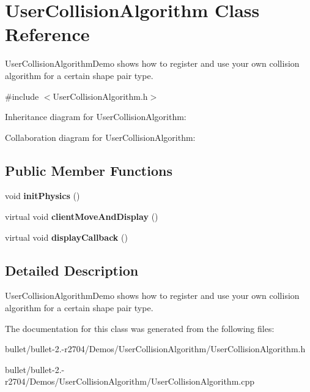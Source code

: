 \hypertarget{class_user_collision_algorithm}{\section{User\+Collision\+Algorithm Class Reference}
\label{class_user_collision_algorithm}
}


User\+Collision\+Algorithm\+Demo shows how to register and use your own collision algorithm for a certain shape pair type.  




{\ttfamily \#include $<$User\+Collision\+Algorithm.\+h$>$}



Inheritance diagram for User\+Collision\+Algorithm\+:


Collaboration diagram for User\+Collision\+Algorithm\+:
\subsection*{Public Member Functions}
\begin{DoxyCompactItemize}
\item 
\hypertarget{class_user_collision_algorithm_adafd6d63e2836fc74a3766aaf11a9df6}{void {\bfseries init\+Physics} ()}\label{class_user_collision_algorithm_adafd6d63e2836fc74a3766aaf11a9df6}

\item 
\hypertarget{class_user_collision_algorithm_afea476b5fac5451d4fbebf6a2bc62844}{virtual void {\bfseries client\+Move\+And\+Display} ()}\label{class_user_collision_algorithm_afea476b5fac5451d4fbebf6a2bc62844}

\item 
\hypertarget{class_user_collision_algorithm_a23e7fd07c13814ffe8f32566d62c318a}{virtual void {\bfseries display\+Callback} ()}\label{class_user_collision_algorithm_a23e7fd07c13814ffe8f32566d62c318a}

\end{DoxyCompactItemize}


\subsection{Detailed Description}
User\+Collision\+Algorithm\+Demo shows how to register and use your own collision algorithm for a certain shape pair type. 

The documentation for this class was generated from the following files\+:\begin{DoxyCompactItemize}
\item 
bullet/bullet-\/2.-\/r2704/\+Demos/\+User\+Collision\+Algorithm/User\+Collision\+Algorithm.\+h\item 
bullet/bullet-\/2.-\/r2704/\+Demos/\+User\+Collision\+Algorithm/User\+Collision\+Algorithm.\+cpp\end{DoxyCompactItemize}
